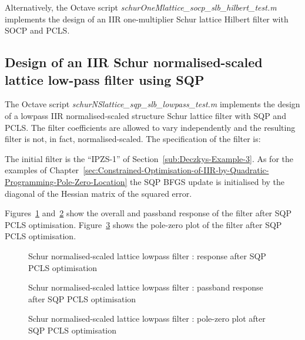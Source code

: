 \documentclass[a4paper,twoside,10pt,english]{report}
\begin{document}
Alternatively, the Octave script 
\emph{schurOneMlattice\_socp\_slb\_hilbert\_test.m} implements the design of an 
IIR one-multiplier Schur lattice Hilbert filter with SOCP and PCLS.
\clearpage
\subsection{Design of an IIR Schur normalised-scaled lattice low-pass filter using SQP}
The Octave script \emph{schurNSlattice\_sqp\_slb\_lowpass\_test.m} implements
the design of a lowpass IIR normalised-scaled structure Schur lattice filter
with SQP and PCLS. The filter coefficients are allowed to vary independently 
and the resulting filter is not, in fact, normalised-scaled. The specification
of the filter is:
\begin{small}

\end{small}
The initial filter is the ``IPZS-1'' of Section~\ref{sub:Deczkys-Example-3}. As
for the examples of 
Chapter~\ref{sec:Constrained-Optimisation-of-IIR-by-Quadratic-Programming-Pole-Zero-Location}
the SQP BFGS update is initialised by the diagonal of the Hessian matrix of the
squared error.

Figures~\ref{fig:Schur-normalised-scaled-lattice-lowpass-filter-SQP-PCLS} 
and~\ref{fig:Schur-normalised-scaled-lattice-lowpass-filter-SQP-PCLS-pass} 
show the overall and passband response of the filter after SQP PCLS optimisation.
Figure~\ref{fig:Schur-normalised-scaled-lattice-lowpass-filter-SQP-PCLS-pz} shows
the pole-zero plot of the filter after SQP PCLS optimisation.

\begin{figure}[!htbp]
\begin{center}
\scalebox{0.7}{}
\caption{Schur normalised-scaled lattice lowpass filter : response after SQP PCLS optimisation}
\label{fig:Schur-normalised-scaled-lattice-lowpass-filter-SQP-PCLS}
\end{center}
\end{figure}
\begin{figure}[!htbp]
\begin{center}
\scalebox{0.7}{}
\caption{Schur normalised-scaled lattice lowpass filter : passband response after SQP PCLS optimisation}
\label{fig:Schur-normalised-scaled-lattice-lowpass-filter-SQP-PCLS-pass}
\end{center}
\end{figure}
\begin{figure}[!htbp]
\begin{center}
\scalebox{0.7}{}
\caption{Schur normalised-scaled lattice lowpass filter : pole-zero plot after SQP PCLS optimisation}
\label{fig:Schur-normalised-scaled-lattice-lowpass-filter-SQP-PCLS-pz}
\end{center}
\end{figure}
\end{document}
